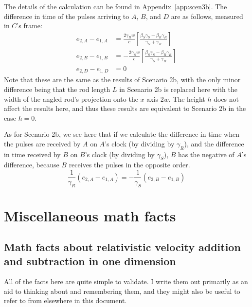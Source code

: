 \documentclass[a4paper]{article}
\theoremstyle{plain}
\theoremstyle{definition}
\begin{document}
The details of the calculation can be found in
Appendix~\ref{app:scen3b}.  The difference in time of the pulses
arriving to $A$, $B$, and $D$ are as follows, measured in $C$'s frame:
\begin{align}
e_{2,A} - e_{1,A}
  & = \frac{2\gamma_R w}{c} \left[ \frac{\beta_S\gamma_S - \beta_R\gamma_R}{\gamma_S + \gamma_R} \right] \label{eqn:scen3b-receiverA} \\
e_{2,B} - e_{1,B}
  & = -\frac{2\gamma_S w}{c} \left[ \frac{\beta_S\gamma_S - \beta_R\gamma_R}{\gamma_S + \gamma_R} \right] \label{eqn:scen3b-receiverB} \\
e_{2,D} - e_{1,D} & = 0 \nonumber
\end{align}
Note that these are the same as the results of Scenario 2b, with the
only minor difference being that the rod length $L$ in Scenario 2b is
replaced here with the width of the angled rod's projection onto the
$x$ axis $2w$.  The height $h$ does not affect the results here, and
thus these results are equivalent to Scenario 2b in the case $h=0$.

As for Scenario 2b, we see here that if we calculate the difference in
time when the pulses are received by $A$ on $A$'s clock (by dividing
by $\gamma_R$), and the difference in time received by $B$ on $B$'s
clock (by dividing by $\gamma_S$), $B$ has the negative of $A$'s
difference, because $B$ receives the pulses in the opposite order.
\begin{equation}
\frac{1}{\gamma_R} (e_{2,A}-e_{1,A}) = - \frac{1}{\gamma_S} (e_{2,B}-e_{1,B})
\end{equation}




\appendix

\section{Miscellaneous math facts}

\subsection{Math facts about relativistic velocity addition and subtraction in one dimension}
\label{app:1drelvelocityadd}

All of the facts here are quite simple to validate.  I write them out
primarily as an aid to thinking about and remembering them, and they
might also be useful to refer to from elsewhere in this document.
\end{document}
